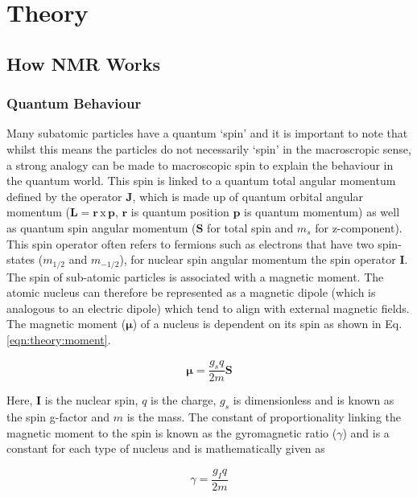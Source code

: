 \chapter{Theory}
\label{Chap:Theory}

\section{How \ac{NMR} Works}
\subsection{Quantum Behaviour}

Many subatomic particles have a quantum `spin' and it is important to note that whilst this means the particles do not necessarily `spin' in the macroscropic sense, a strong analogy can be made to macroscopic spin to explain the behaviour in the quantum world. This spin is linked to a quantum total angular momentum defined by the operator $\mathbf{J}$, which is made up of quantum orbital angular momentum ($\mathbf{L} = \mathbf{r}\, \textrm{x} \, \mathbf{p}$, $\mathbf{r}$ is quantum position $\mathbf{p}$ is quantum momentum) as well as quantum spin angular momentum ($\mathbf{S}$ for total spin and $m_s$ for z-component). This spin operator often refers to fermions such as electrons that have two spin-states ($m_{1/2}$ and $m_{-1/2}$), for nuclear spin angular momentum the spin operator $\mathbf{I}$. The spin of sub-atomic particles is associated with a magnetic moment. The atomic nucleus can therefore be represented as a magnetic dipole (which is analogous to an electric dipole) which tend to align with external magnetic fields. The magnetic moment ($\boldsymbol\mu$) of a nucleus is dependent on its spin as shown in Eq. \ref{eqn:theory:moment}.

\begin{equation}
    \boldsymbol\mu = \frac{g_sq}{2m} \mathbf{S}
    \label{eqn:theory:moment}
\end{equation}

Here, $\mathbf{I}$ is the nuclear spin, $q$ is the charge, $g_s$ is dimensionless and is known as the spin g-factor and $m$ is the mass. The constant of proportionality linking the magnetic moment to the spin is known as the gyromagnetic ratio ($\gamma$) and is a constant for each type of nucleus and is mathematically given as

\begin{equation}
    \gamma = \frac{g_Iq}{2m}
    \label{eqn:theory:gyro}
\end{equation}

